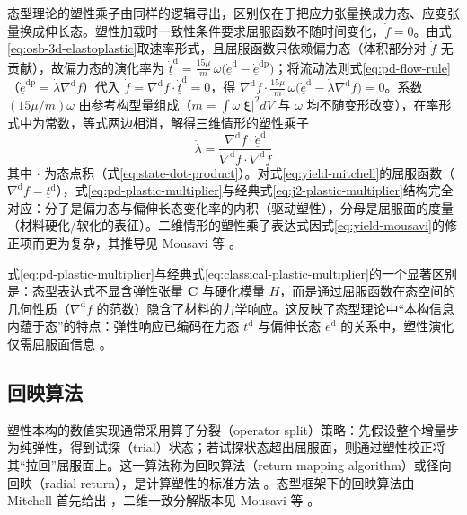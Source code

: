 态型理论的塑性乘子由同样的逻辑导出，区别仅在于把应力张量换成力态、应变张量换成伸长态。塑性加载时一致性条件要求屈服函数不随时间变化，$\dot{f}=0$。由式\eqref{eq:osb-3d-elastoplastic}取速率形式，且屈服函数只依赖偏力态（体积部分对 $\dot{f}$ 无贡献），故偏力态的演化率为 $\dot{\underline{t}}^{\mathrm{d}}=\tfrac{15\mu}{m}\,\omega\bigl(\dot{\underline{e}}^{\mathrm{d}}-\dot{\underline{e}}^{\mathrm{dp}}\bigr)$；将流动法则式\eqref{eq:pd-flow-rule}（$\dot{\underline{e}}^{\mathrm{dp}}=\dot{\lambda}\nabla^{\mathrm{d}}f$）代入 $\dot{f}=\nabla^{\mathrm{d}}f\cdot\dot{\underline{t}}^{\mathrm{d}}=0$，得 $\nabla^{\mathrm{d}}f\cdot\tfrac{15\mu}{m}\,\omega\bigl(\dot{\underline{e}}^{\mathrm{d}}-\dot{\lambda}\nabla^{\mathrm{d}}f\bigr)=0$。系数 $(15\mu/m)\omega$ 由参考构型量组成（$m=\int\omega|\boldsymbol{\xi}|^{2}dV$ 与 $\omega$ 均不随变形改变），在率形式中为常数，等式两边相消，解得三维情形的塑性乘子
\begin{equation}
  \dot{\lambda}=\frac{\nabla^{\mathrm{d}}f\cdot\dot{\underline{e}}^{\mathrm{d}}}
  {\nabla^{\mathrm{d}}f\cdot\nabla^{\mathrm{d}}f}
  \label{eq:pd-plastic-multiplier}
\end{equation}
其中 $\cdot$ 为态点积（式\eqref{eq:state-dot-product}）。对式\eqref{eq:yield-mitchell}的屈服函数（$\nabla^{\mathrm{d}}f=\underline{t}^{\mathrm{d}}$），式\eqref{eq:pd-plastic-multiplier}与经典式\eqref{eq:j2-plastic-multiplier}结构完全对应：分子是偏力态与偏伸长态变化率的内积（驱动塑性），分母是屈服面的度量（材料硬化/软化的表征）\cite{Mitchell2011}。二维情形的塑性乘子表达式因式\eqref{eq:yield-mousavi}的修正项而更为复杂，其推导见 Mousavi 等 \cite{Mousavi2021}。

\begin{remark}
  式\eqref{eq:pd-plastic-multiplier}与经典式\eqref{eq:classical-plastic-multiplier}的一个显著区别是：态型表达式不显含弹性张量 $\mathbf{C}$ 与硬化模量 $H$，而是通过屈服函数在态空间的几何性质（$\nabla^{\mathrm{d}}f$ 的范数）隐含了材料的力学响应。这反映了态型理论中“本构信息内蕴于态”的特点：弹性响应已编码在力态 $\underline{t}^{\mathrm{d}}$ 与偏伸长态 $\underline{e}^{\mathrm{d}}$ 的关系中，塑性演化仅需屈服面信息 \cite{Mitchell2011}。
\end{remark}

\subsection{回映算法}\label{sec:plastic-return}

塑性本构的数值实现通常采用算子分裂（operator split）策略：先假设整个增量步为纯弹性，得到试探（trial）状态；若试探状态超出屈服面，则通过塑性校正将其“拉回”屈服面上。这一算法称为回映算法（return mapping algorithm）或径向回映（radial return），是计算塑性的标准方法 \cite{SimoHughes1998}。态型框架下的回映算法由 Mitchell 首先给出 \cite{Mitchell2011}，二维一致分解版本见 Mousavi 等 \cite{Mousavi2021}。

